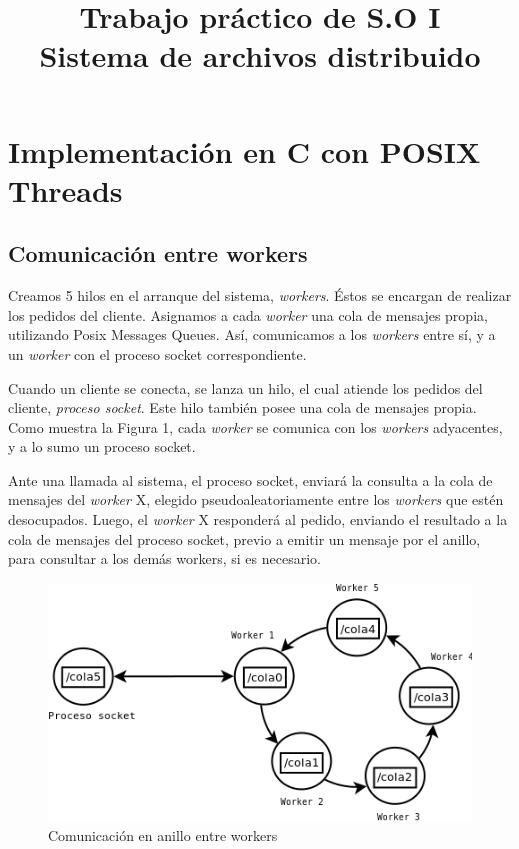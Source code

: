 \documentclass[a4paper, 8pt]{article}
\title{Trabajo práctico de S.O I \\ Sistema de archivos distribuido}
\begin{document}
\maketitle

\section{Implementación en C con POSIX Threads}

\subsection{Comunicación entre workers}

Creamos 5 hilos en el arranque del sistema, \textit{workers}. Éstos se encargan de realizar los pedidos del cliente.
Asignamos a cada \textit{worker} una cola de mensajes propia, utilizando Posix Messages Queues. Así, comunicamos a los \textit{workers} entre sí,
y a un \textit{worker} con el proceso socket correspondiente.

Cuando un cliente se conecta, se lanza un hilo, el cual atiende los pedidos del cliente, \textit{proceso socket}.
Este hilo también posee una cola de mensajes propia.
Como muestra la Figura 1, cada \textit{worker} se comunica con los \textit{workers} adyacentes, y a lo sumo un proceso socket.

Ante una llamada al sistema, el proceso socket, enviará la consulta a la cola de mensajes del \textit{worker} X, elegido pseudoaleatoriamente
entre los \textit{workers} que estén desocupados.
Luego, el \textit{worker} X responderá al pedido, enviando el resultado a la cola de mensajes del proceso socket,
previo a emitir un mensaje por el anillo, para consultar a los demás workers, si es necesario.


 \begin{figure}[htbp]
   \centering
     \includegraphics[scale=0.75]{dia1.png}
     \caption{Comunicación en anillo entre workers}
   \label{Figura 1}
 \end{figure}
\end{document}
